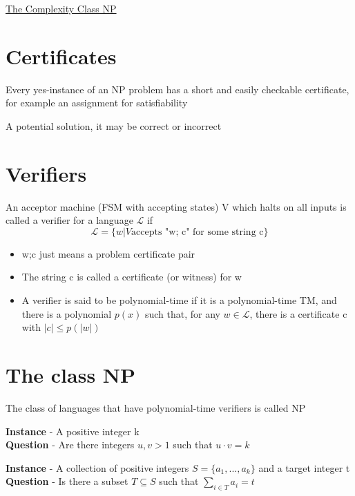 \documentclass{article}[18pt]
\begin{document}
\begin{center}
\underline{\huge The Complexity Class NP}
\end{center}
\section{Certificates}
Every yes-instance of an NP problem has a short and easily checkable certificate, for example an assignment for satisfiability
\begin{definition}[Certificate]
A potential solution, it may be correct or incorrect
\end{definition}
\section{Verifiers}
\begin{definition}[Verifier]
An acceptor machine (FSM with accepting states) V which halts on all inputs is called a verifier for a language $\mathcal{L}$ if
$$\mathcal{L}=\{w| V \text{accepts "w; c" for some string c}\}$$
\end{definition}
\begin{itemize}
	\item w;c just means a problem certificate pair
	\item The string c is called a certificate (or witness) for w
	\item A verifier is said to be polynomial-time if it is a polynomial-time TM, and there is a polynomial $p(x)$ such that, for any $w\in \mathcal{L}$, there is a certificate c with $|c|\leqslant p(|w|)$
\end{itemize}
\section{The class NP}
\begin{definition}[NP]
	The class of languages that have polynomial-time verifiers is called NP	
\end{definition}
\begin{problem}
\textbf{Instance} - A positive integer k\\
\textbf{Question} - Are there integers $u,v>1$ such that $u\cdot v=k$
\end{problem}
\begin{problem}
\textbf{Instance} - A collection of positive integers $S=\{a_1,...,a_k\}$ and a target integer t\\
\textbf{Question} - Is there a subset $T\subseteq S$ such that $\sum_{i\in T}a_i=t$
\end{problem}
\end{document}
